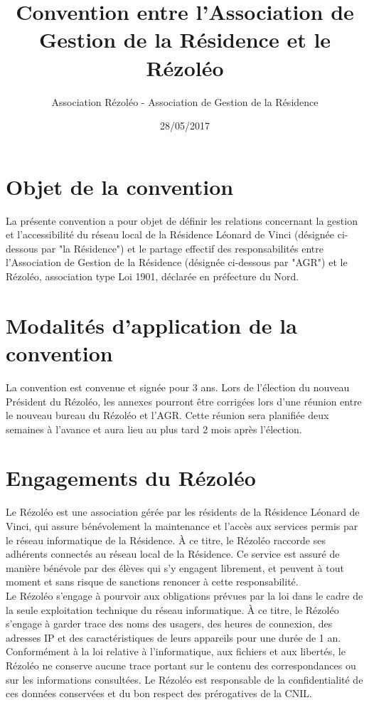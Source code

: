\documentclass[12pt]{constitution}
\begin{document}
\title{Convention entre l'Association de Gestion de la Résidence et le Rézoléo}
\author{Association Rézoléo - Association de Gestion de la Résidence}
\date{28/05/2017}
\maketitle

\section{Objet de la convention}

    La présente convention a pour objet de définir les relations concernant la gestion et l'accessibilité du réseau local de la Résidence Léonard de Vinci (désignée ci-dessous par "la Résidence") et le partage effectif des responsabilités entre l'Association de Gestion de la Résidence (désignée ci-dessous par "AGR") et le Rézoléo, association type Loi 1901, déclarée en préfecture du Nord.


\section{Modalités d'application de la convention}

    La convention est convenue et signée pour 3 ans. Lors de l'élection du nouveau Président du Rézoléo, les annexes pourront être corrigées lors d'une réunion entre le nouveau bureau du Rézoléo et l'AGR. Cette réunion sera planifiée deux semaines à l'avance et aura lieu au plus tard 2 mois après l'élection.


\section{Engagements du Rézoléo}

    Le Rézoléo est une association gérée par les résidents de la Résidence Léonard de Vinci, qui assure bénévolement la maintenance et l'accès aux services permis par le réseau informatique de la Résidence. À ce titre, le Rézoléo raccorde ses adhérents connectés au réseau local de la Résidence. Ce service est assuré de manière bénévole par des élèves qui s'y engagent librement, et peuvent à tout moment et sans risque de sanctions renoncer à cette responsabilité.\\


    Le Rézoléo s'engage à pourvoir aux obligations prévues par la loi dans le cadre de la seule exploitation technique du réseau informatique. À ce titre, le Rézoléo s'engage à garder trace des noms des usagers, des heures de connexion, des adresses IP et des caractéristiques de leurs appareils pour une durée de 1 an. Conformément à la loi relative à l'informatique, aux fichiers et aux libertés, le Rézoléo ne conserve aucune trace portant sur le contenu des correspondances ou sur les informations consultées. Le Rézoléo est responsable de la confidentialité de ces données conservées et du bon respect des prérogatives de la CNIL.\\
\end{document}
